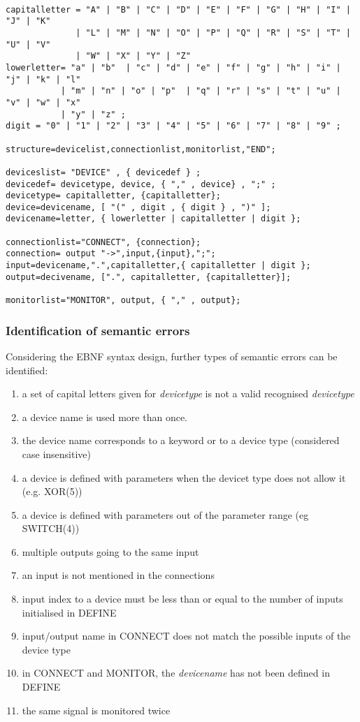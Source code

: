 \documentclass[a4paper,11pt]{article}
\providecommand{\tightlist}{%
	\setlength{\itemsep}{0pt}\setlength{\parskip}{0pt}}
\numberwithin{equation}{section}
\begin{document}
\begin{lstlisting}[caption= EBNF of the logic syntax]                                   

capitalletter = "A" | "B" | "C" | "D" | "E" | "F" | "G" | "H" | "I" | "J" | "K" 
		  	  | "L" | "M" | "N" | "O" | "P" | "Q" | "R" | "S" | "T" | "U" | "V" 
		  	  | "W" | "X" | "Y" | "Z" 
lowerletter= "a" | "b"	| "c" | "d" | "e" | "f" | "g" | "h" | "i" | "j" | "k" | "l" 
		   | "m" | "n" | "o" | "p"	| "q" | "r" | "s" | "t" | "u" | "v" | "w" | "x" 
		   | "y" | "z" ;
digit = "0" | "1" | "2" | "3" | "4" | "5" | "6" | "7" | "8" | "9" ;

structure=devicelist,connectionlist,monitorlist,"END";

deviceslist= "DEVICE" , { devicedef } ;
devicedef= devicetype, device, { "," , device} , ";" ;
devicetype= capitalletter, {capitalletter};
device=devicename, [ "(" , digit , { digit } , ")" ];
devicename=letter, { lowerletter | capitalletter | digit };

connectionlist="CONNECT", {connection};
connection= output "->",input,{input},";";
input=devicename,".",capitalletter,{ capitalletter | digit };       
output=decivename, [".", capitalletter, {capitalletter}];          

monitorlist="MONITOR", output, { "," , output};         
\end{lstlisting}

\subsubsection{Identification of semantic errors} \label{ident_sem_error}
Considering the EBNF syntax design, further types of semantic errors can be identified:
\begin{enumerate}
	\tightlist
	\item a set of capital letters given for \textit{devicetype} is not a valid recognised \textit{devicetype}
	\item a device name is used more than once.
	\item the device name corresponds to a keyword or to a device type (considered case insensitive)
	\item a device is defined with parameters when the devicet type does not allow it (e.g. XOR(5))
	\item a device is defined with parameters out of the parameter range (eg SWITCH(4))
	\item multiple outputs going to the same input
	\item an input is not mentioned in the connections
	\item input index to a device must be less than or equal to the number of inputs initialised in DEFINE
	\item input/output name in CONNECT does not match the possible inputs of the device type
	\item in CONNECT and MONITOR, the \textit{devicename} has not been defined in DEFINE
	\item the same signal is monitored twice
\end{enumerate}
\end{document}
